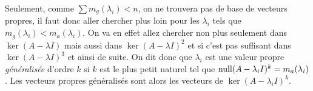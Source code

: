 Seulement, comme $\sum m_g(\lambda_i) < n$, on ne trouvera pas
de base de vecteurs propres, il faut donc aller chercher plus loin
pour les $\lambda_i$ tels que $m_g(\lambda_i) < m_a(\lambda_i)$.
On va en effet allez chercher non plus seulement dans $\ker(A - \lambda I)$
mais aussi dans $\ker(A - \lambda I)^2$ et si c'est pas suffisant dans
$\ker(A - \lambda I)^3$ et ainsi de suite.
On dit donc que $\lambda_i$ est une valeur propre \emph{généralisée}
d'ordre $k$ si $k$ est le plus petit naturel tel que
$\operatorname{null}(A - \lambda_i I)^k = m_a(\lambda_i)$.
Les vecteurs propres généralisés sont alors les vecteurs de
$\ker(A - \lambda_i I)^k$.


